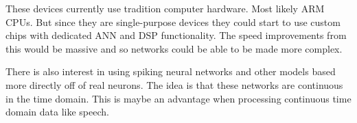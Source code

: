 \documentclass[10pt]{article}
\begin{document}
        These devices currently use tradition computer hardware. Most likely ARM CPUs. But since they are single-purpose devices they could start to use custom chips with dedicated ANN and DSP functionality. The speed improvements from this would be massive and so networks could be able to be made more complex.
        
        There is also interest in using spiking neural networks and other models based more directly off of real neurons\cite{tsai2017always}. The idea is that these networks are continuous in the time domain. This is maybe an advantage when processing continuous time domain data like speech.

        \newpage
	\vspace{6cm}
	\printbibliography
\end{document}
